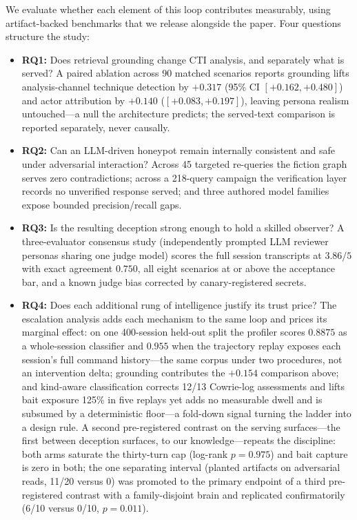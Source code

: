 We evaluate whether each element of this loop contributes measurably,
using
artifact-backed benchmarks that we release alongside the paper. Four
questions structure the study:
\begin{itemize}
\item \textbf{RQ1:} Does retrieval grounding change CTI analysis, and
separately what is served? A paired ablation across 90 matched scenarios
reports grounding lifts analysis-channel technique detection by $+0.317$
(95\% CI $[+0.162, +0.480]$) and actor attribution by $+0.140$
($[+0.083, +0.197]$), leaving persona realism untouched---a null the
architecture predicts; the served-text comparison is reported separately,
never causally.
\item \textbf{RQ2:} Can an LLM-driven honeypot remain internally
consistent and safe under adversarial interaction? Across 45 targeted
re-queries the fiction graph serves zero contradictions; across a
218-query campaign the verification layer records no unverified response
served; and three authored model families expose bounded
precision/recall gaps.
\item \textbf{RQ3:} Is the resulting deception strong enough to hold a
skilled observer? A three-evaluator consensus study (independently
prompted LLM reviewer personas sharing one judge model) scores the full
session transcripts at $3.86/5$ with exact agreement $0.750$, all eight
scenarios at or above the acceptance bar, and a known judge bias
corrected by canary-registered secrets.
\item \textbf{RQ4:} Does each additional rung of intelligence justify its
trust price? The escalation analysis adds each mechanism to the same loop
and prices its marginal effect: on one 400-session held-out split the
profiler scores $0.8875$ as a whole-session classifier and $0.955$ when
the trajectory replay exposes each session's full command history---the
same corpus under two procedures, not an intervention delta; grounding
contributes the $+0.154$ comparison above; and kind-aware classification corrects 12/13 Cowrie-log assessments and
lifts bait exposure 125\% in five replays yet adds no measurable dwell
and is subsumed by a deterministic floor---a fold-down signal turning the
ladder into a design rule. A second pre-registered contrast on the serving surfaces---the first
between deception surfaces, to our knowledge---repeats the discipline:
both arms saturate the thirty-turn cap (log-rank $p=0.975$) and bait
capture is zero in both; the one separating interval (planted artifacts on adversarial reads,
11/20 versus 0) was promoted to the primary endpoint of a third
pre-registered contrast with a family-disjoint brain and replicated
confirmatorily (6/10 versus 0/10, $p=0.011$).
\end{itemize}

